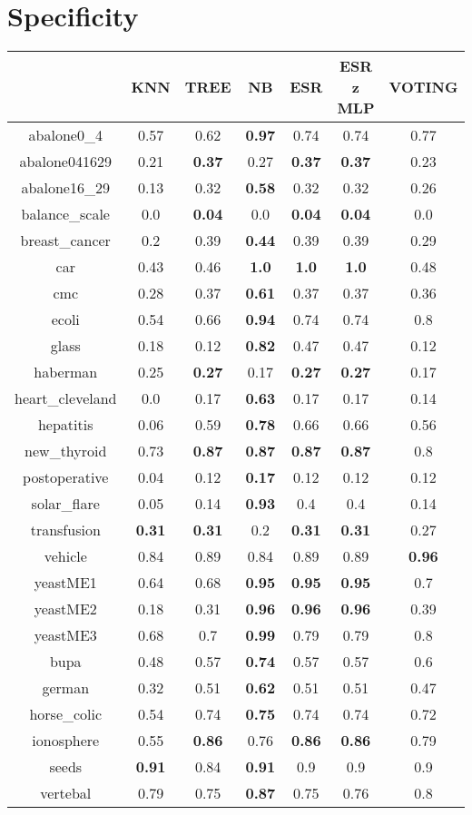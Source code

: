 \documentclass{article}%
\begin{document}
%
\section*{Specificity}%
\begin{tabular}{c|cccccc}%
\hline%
&KNN&TREE&NB&ESR&ESR z MLP&VOTING\\%
\hline%
abalone0\_4&0.57&0.62&\textbf{0.97}&0.74&0.74&0.77\\%
\hline%
abalone041629&0.21&\textbf{0.37}&0.27&\textbf{0.37}&\textbf{0.37}&0.23\\%
\hline%
abalone16\_29&0.13&0.32&\textbf{0.58}&0.32&0.32&0.26\\%
\hline%
balance\_scale&0.0&\textbf{0.04}&0.0&\textbf{0.04}&\textbf{0.04}&0.0\\%
\hline%
breast\_cancer&0.2&0.39&\textbf{0.44}&0.39&0.39&0.29\\%
\hline%
car&0.43&0.46&\textbf{1.0}&\textbf{1.0}&\textbf{1.0}&0.48\\%
\hline%
cmc&0.28&0.37&\textbf{0.61}&0.37&0.37&0.36\\%
\hline%
ecoli&0.54&0.66&\textbf{0.94}&0.74&0.74&0.8\\%
\hline%
glass&0.18&0.12&\textbf{0.82}&0.47&0.47&0.12\\%
\hline%
haberman&0.25&\textbf{0.27}&0.17&\textbf{0.27}&\textbf{0.27}&0.17\\%
\hline%
heart\_cleveland&0.0&0.17&\textbf{0.63}&0.17&0.17&0.14\\%
\hline%
hepatitis&0.06&0.59&\textbf{0.78}&0.66&0.66&0.56\\%
\hline%
new\_thyroid&0.73&\textbf{0.87}&\textbf{0.87}&\textbf{0.87}&\textbf{0.87}&0.8\\%
\hline%
postoperative&0.04&0.12&\textbf{0.17}&0.12&0.12&0.12\\%
\hline%
solar\_flare&0.05&0.14&\textbf{0.93}&0.4&0.4&0.14\\%
\hline%
transfusion&\textbf{0.31}&\textbf{0.31}&0.2&\textbf{0.31}&\textbf{0.31}&0.27\\%
\hline%
vehicle&0.84&0.89&0.84&0.89&0.89&\textbf{0.96}\\%
\hline%
yeastME1&0.64&0.68&\textbf{0.95}&\textbf{0.95}&\textbf{0.95}&0.7\\%
\hline%
yeastME2&0.18&0.31&\textbf{0.96}&\textbf{0.96}&\textbf{0.96}&0.39\\%
\hline%
yeastME3&0.68&0.7&\textbf{0.99}&0.79&0.79&0.8\\%
\hline%
bupa&0.48&0.57&\textbf{0.74}&0.57&0.57&0.6\\%
\hline%
german&0.32&0.51&\textbf{0.62}&0.51&0.51&0.47\\%
\hline%
horse\_colic&0.54&0.74&\textbf{0.75}&0.74&0.74&0.72\\%
\hline%
ionosphere&0.55&\textbf{0.86}&0.76&\textbf{0.86}&\textbf{0.86}&0.79\\%
\hline%
seeds&\textbf{0.91}&0.84&\textbf{0.91}&0.9&0.9&0.9\\%
\hline%
vertebal&0.79&0.75&\textbf{0.87}&0.75&0.76&0.8\\%
\hline%
\end{tabular}
\end{document}
